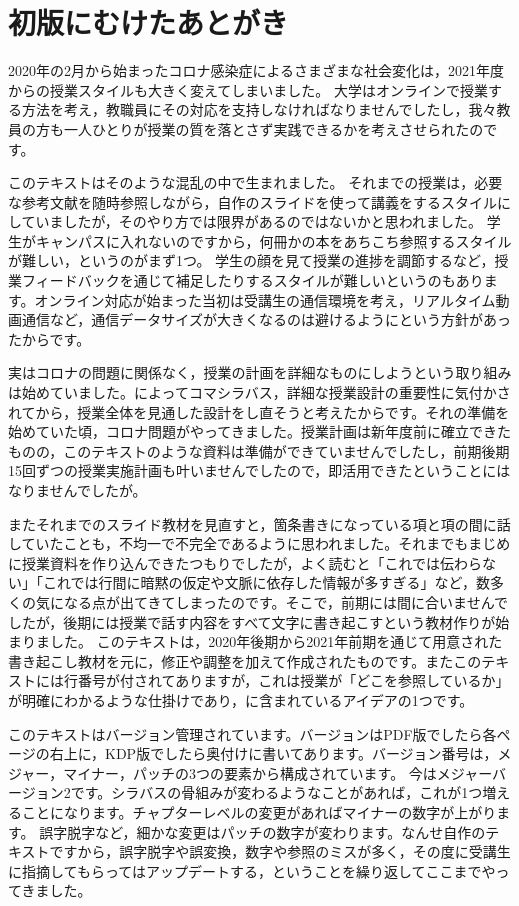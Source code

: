 
\section*{初版にむけたあとがき}

2020年の2月から始まったコロナ感染症によるさまざまな社会変化は，2021年度からの授業スタイルも大きく変えてしまいました。
大学はオンラインで授業する方法を考え，教職員にその対応を支持しなければなりませんでしたし，我々教員の方も一人ひとりが授業の質を落とさず実践できるかを考えさせられたのです。

このテキストはそのような混乱の中で生まれました。
それまでの授業は，必要な参考文献を随時参照しながら，自作のスライドを使って講義をするスタイルにしていましたが，そのやり方では限界があるのではないかと思われました。
学生がキャンパスに入れないのですから，何冊かの本をあちこち参照するスタイルが難しい，というのがまず1つ。
学生の顔を見て授業の進捗を調節するなど，授業フィードバックを通じて補足したりするスタイルが難しいというのもあります。オンライン対応が始まった当初は受講生の通信環境を考え，リアルタイム動画通信など，通信データサイズが大きくなるのは避けるようにという方針があったからです。

実はコロナの問題に関係なく，授業の計画を詳細なものにしようという取り組みは始めていました。\textcite{Ashida2019}によってコマシラバス，詳細な授業設計の重要性に気付かされてから，授業全体を見通した設計をし直そうと考えたからです。それの準備を始めていた頃，コロナ問題がやってきました。授業計画は新年度前に確立できたものの，このテキストのような資料は準備ができていませんでしたし，前期後期15回ずつの授業実施計画も叶いませんでしたので，即活用できたということにはなりませんでしたが。

またそれまでのスライド教材を見直すと，箇条書きになっている項と項の間に話していたことも，不均一で不完全であるように思われました。それまでもまじめに授業資料を作り込んできたつもりでしたが，よく読むと「これでは伝わらない」「これでは行間に暗黙の仮定や文脈に依存した情報が多すぎる」など，数多くの気になる点が出てきてしまったのです。そこで，前期には間に合いませんでしたが，後期には授業で話す内容をすべて文字に書き起こすという教材作りが始まりました。
このテキストは，2020年後期から2021年前期を通じて用意された書き起こし教材を元に，修正や調整を加えて作成されたものです。またこのテキストには行番号が付されてありますが，これは授業が「どこを参照しているか」が明確にわかるような仕掛けであり，\textcite{Ashida2019}に含まれているアイデアの1つです。

このテキストはバージョン管理されています。バージョンはPDF版でしたら各ページの右上に，KDP版でしたら奥付けに書いてあります。バージョン番号は，メジャー，マイナー，パッチの3つの要素から構成されています。
今はメジャーバージョン2です。シラバスの骨組みが変わるようなことがあれば，これが1つ増えることになります。チャプターレベルの変更があればマイナーの数字が上がります。
誤字脱字など，細かな変更はパッチの数字が変わります。なんせ自作のテキストですから，誤字脱字や誤変換，数字や参照のミスが多く，その度に受講生に指摘してもらってはアップデートする，ということを繰り返してここまでやってきました。

